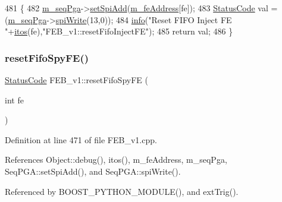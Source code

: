 \begin{DoxyCode}
481                                           \{  
482   \hyperlink{classFEB__v1_a6c7804ac86796f233a8393043adf2e77}{m\_seqPga}->\hyperlink{classSeqPGA_ac998ce3a6d9b5f2e88cc8393f8c1df53}{setSpiAdd}(\hyperlink{classFEB__v1_a4e1945c2d5b434125f375e9d0fc6d99f}{m\_feAddress}[fe]);
483   \hyperlink{classStatusCode}{StatusCode} val = (\hyperlink{classFEB__v1_a6c7804ac86796f233a8393043adf2e77}{m\_seqPga}->\hyperlink{classSeqPGA_ad4421841ce4ce8b88ad13f63216f0743}{spiWrite}(13,0));
484   \hyperlink{classObject_a644fd329ea4cb85f54fa6846484b84a8}{info}(\textcolor{stringliteral}{"Reset FIFO Inject FE "}+\hyperlink{Tools_8h_af330027dbdafb9a30768b3613c553e60}{itos}(fe),\textcolor{stringliteral}{"FEB\_v1::resetFifoInjectFE"});
485   \textcolor{keywordflow}{return} val;
486 \}
\end{DoxyCode}
\mbox{\label{classFEB__v1_ab02c292e29e01079bb9b268acbc782b1}} 
\subsubsection{\texorpdfstring{reset\+Fifo\+Spy\+F\+E()}{resetFifoSpyFE()}}
{\footnotesize\ttfamily \hyperlink{classStatusCode}{Status\+Code} F\+E\+B\+\_\+v1\+::reset\+Fifo\+Spy\+FE (\begin{DoxyParamCaption}\item[{int}]{fe }\end{DoxyParamCaption})}



Definition at line 471 of file F\+E\+B\+\_\+v1.\+cpp.



References Object\+::debug(), itos(), m\+\_\+fe\+Address, m\+\_\+seq\+Pga, Seq\+P\+G\+A\+::set\+Spi\+Add(), and Seq\+P\+G\+A\+::spi\+Write().



Referenced by B\+O\+O\+S\+T\+\_\+\+P\+Y\+T\+H\+O\+N\+\_\+\+M\+O\+D\+U\+L\+E(), and ext\+Trig().


